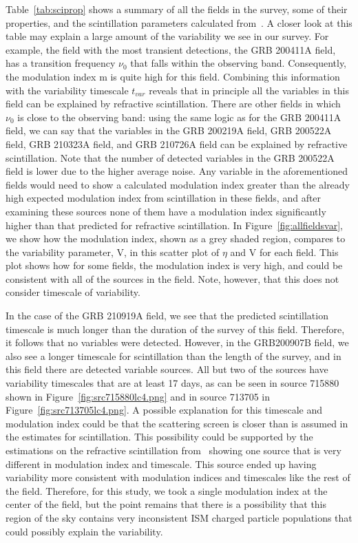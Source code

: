 \documentclass[12pt]{article}
\begin{document}
Table~\ref{tab:sciprop} shows a summary of all the fields in the survey, some of their properties, and the scintillation parameters calculated from~\citet{2019arXiv190708395H}. A closer look at this table may explain a large amount of the variability we see in our survey. For example, the field with the most transient detections, the GRB 200411A field, has a transition frequency $\nu_0$ that falls within the observing band. Consequently, the modulation index m is quite high for this field. Combining this information with the variability timescale $t_{var}$ reveals that in principle all the variables in this field can be explained by refractive scintillation. There are other fields in which $\nu_0$ is close to the observing band: using the same logic as for the GRB 200411A field, we can say that the variables in the GRB 200219A field, GRB 200522A field, GRB 210323A field, and GRB 210726A field can be explained by refractive scintillation. Note that the number of detected variables in the GRB 200522A field is lower due to the higher average noise. Any variable in the aforementioned fields would need to show a calculated modulation index greater than the already high expected modulation index from scintillation in these fields, and after examining these sources none of them have a modulation index significantly higher than that predicted for refractive scintillation. In Figure~\ref{fig:allfieldsvar}, we show how the modulation index, shown as a grey shaded region, compares to the variability parameter, V, in this scatter plot of $\eta$ and V for each field. This plot shows how for some fields, the modulation index is very high, and could be consistent with all of the sources in the field. Note, however, that this does not consider timescale of variability.

In the case of the GRB 210919A field, we see that the predicted scintillation timescale is much longer than the duration of the survey of this field. Therefore, it follows that no variables were detected. However, in the GRB200907B field, we also see a longer timescale for scintillation than the length of the survey, and in this field there are detected variable sources. All but two of the sources have variability timescales that are at least 17 days, as can be seen in source 715880 shown in Figure~\ref{fig:src715880lc4.png} and in source 713705 in Figure~\ref{fig:src713705lc4.png}. A possible explanation for this timescale and modulation index could be that the scattering screen is closer than is assumed in the estimates for scintillation. This possibility could be supported by the estimations on the refractive scintillation from~\citet{2019arXiv190708395H} showing one source that is very different in modulation index and timescale. This source ended up having variability more consistent with modulation indices and timescales like the rest of the field. Therefore, for this study, we took a single modulation index at the center of the field, but the point remains that there is a possibility that this region of the sky contains very inconsistent ISM charged particle populations that could possibly explain the variability.
\end{document}
